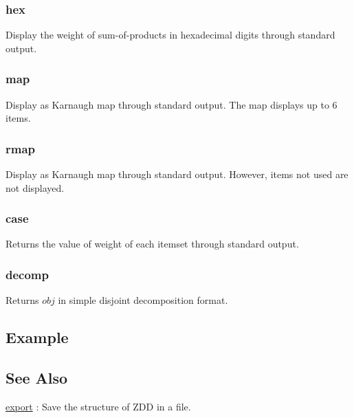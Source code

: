 \subsubsection*{hex}
Display the weight of sum-of-products in hexadecimal digits through standard output. 
\subsubsection*{map}
Display as Karnaugh map through standard output. 
The map displays up to 6 items.

\subsubsection*{rmap}
Display as Karnaugh map through standard output. 
However, items not used are not displayed. 
\subsubsection*{case}
Returns the value of weight of each itemset through standard output. 
\subsubsection*{decomp}
Returns $obj$ in simple disjoint decomposition format. 
\fi

\subsection*{Example}


\subsection*{See Also}
\hyperref[sect:export]{export} : Save the structure of ZDD in a file.
